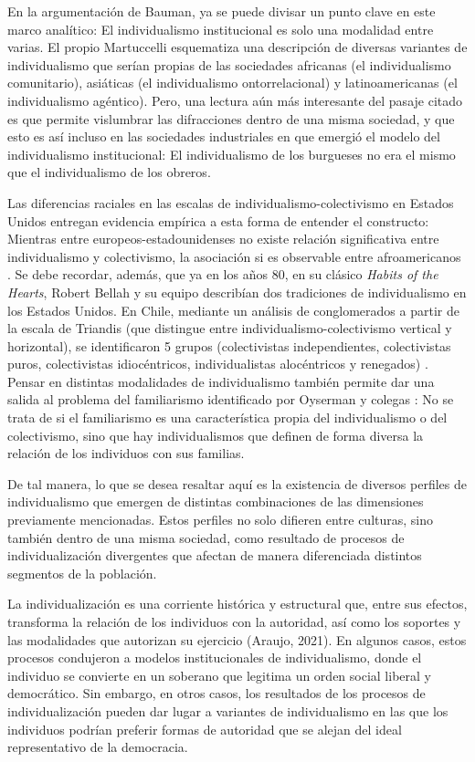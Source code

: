 \documentclass[12pt,twoside]{templates/facsothesis}
\begin{document}
En la argumentación de Bauman, ya se puede divisar un punto clave en este marco analítico: El individualismo institucional es solo una modalidad entre varias. El propio Martuccelli \citeyearpar{martuccelli2018} esquematiza una descripción de diversas variantes de individualismo que serían propias de las sociedades africanas (el individualismo comunitario), asiáticas (el individualismo ontorrelacional) y latinoamericanas (el individualismo agéntico). Pero, una lectura aún más interesante del pasaje citado es que permite vislumbrar las difracciones dentro de una misma sociedad, y que esto es así incluso en las sociedades industriales en que emergió el modelo del individualismo institucional: El individualismo de los burgueses no era el mismo que el individualismo de los obreros.

Las diferencias raciales en las escalas de individualismo-colectivismo en Estados Unidos \citep{oyserman2002, komarraju2008} entregan evidencia empírica a esta forma de entender el constructo: Mientras entre europeos-estadounidenses no existe relación significativa entre individualismo y colectivismo, la asociación si es observable entre afroamericanos \citep{komarraju2008}. Se debe recordar, además, que ya en los años 80, en su clásico \emph{Habits of the Hearts}, Robert Bellah y su equipo describían dos tradiciones de individualismo en los Estados Unidos. En Chile, mediante un análisis de conglomerados a partir de la escala de Triandis (que distingue entre individualismo-colectivismo vertical y horizontal), se identificaron 5 grupos (colectivistas independientes, colectivistas puros, colectivistas idiocéntricos, individualistas alocéntricos y renegados) \citep{rojas2008}. Pensar en distintas modalidades de individualismo también permite dar una salida al problema del familiarismo identificado por Oyserman y colegas \citeyearpar{oyserman2002}: No se trata de si el familiarismo es una característica propia del individualismo o del colectivismo, sino que hay individualismos que definen de forma diversa la relación de los individuos con sus familias.

De tal manera, lo que se desea resaltar aquí es la existencia de diversos perfiles de individualismo que emergen de distintas combinaciones de las dimensiones previamente mencionadas. Estos perfiles no solo difieren entre culturas, sino también dentro de una misma sociedad, como resultado de procesos de individualización divergentes que afectan de manera diferenciada distintos segmentos de la población.

La individualización es una corriente histórica y estructural que, entre sus efectos, transforma la relación de los individuos con la autoridad, así como los soportes y las modalidades que autorizan su ejercicio (Araujo, 2021). En algunos casos, estos procesos condujeron a modelos institucionales de individualismo, donde el individuo se convierte en un soberano que legitima un orden social liberal y democrático. Sin embargo, en otros casos, los resultados de los procesos de individualización pueden dar lugar a variantes de individualismo en las que los individuos podrían preferir formas de autoridad que se alejan del ideal representativo de la democracia.
\end{document}
